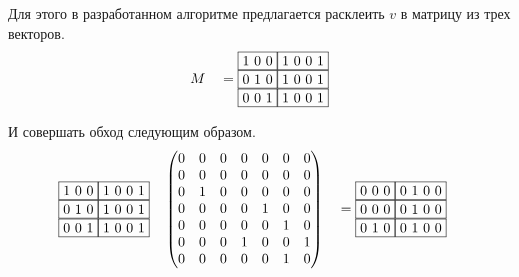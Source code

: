\begin{example}
    Для этого в разработанном алгоритме предлагается расклеить $v$ в матрицу из трех векторов.
    \begin{alignat*}{7}
      & &&M &&=\begin{matrix}
        \fbox{1 0 0} \fbox{1 0 0 1} \\ 
        \fbox{0 1 0} \fbox{1 0 0 1} \\
        \fbox{0 0 1} \fbox{1 0 0 1}
            \end{matrix}
      \end{alignat*}

    И совершать обход следующим образом.
    \begin{alignat*}{7}
      & \begin{matrix}
        \fbox{1 0 0} \fbox{1 0 0 1} \\ 
        \fbox{0 1 0} \fbox{1 0 0 1} \\
        \fbox{0 0 1} \fbox{1 0 0 1}
          \end{matrix}  && \begin{pmatrix}
          0 & 0 & 0 & 0 & 0 & 0 & 0 \\
          0 & 0 & 0 & 0 & 0 & 0 & 0 \\
          0 & 1 & 0 & 0 & 0 & 0 & 0 \\
          0 & 0 & 0 & 0 & 1 & 0 & 0 \\
          0 & 0 & 0 & 0 & 0 & 1 & 0 \\
          0 & 0 & 0 & 1 & 0 & 0 & 1 \\
          0 & 0 & 0 & 0 & 0 & 1 & 0 
          \end{pmatrix} &&= \begin{matrix}
            \fbox{0 0 0} \fbox{0 1 0 0} \\ 
            \fbox{0 0 0} \fbox{0 1 0 0} \\
            \fbox{0 1 0} \fbox{0 1 0 0}
            \end{matrix}
      \end{alignat*}
    

\end{example}
